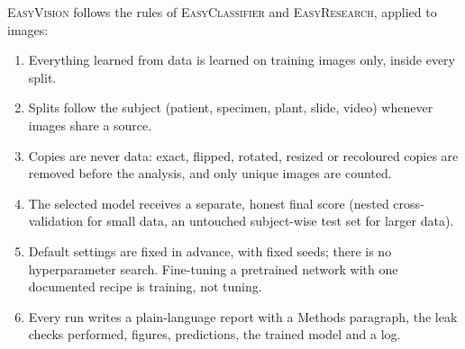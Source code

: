 \documentclass[11pt,a4paper]{article}
\newcommand{\EV}{\textsc{EasyVision}}
\newcommand{\EC}{\textsc{EasyClassifier}}
\newcommand{\ER}{\textsc{EasyResearch}}
\begin{document}
\EV{} follows the rules of \EC{} and \ER, applied to images:
\begin{enumerate}
  \item Everything learned from data is learned on training images only, inside every split.
  \item Splits follow the subject (patient, specimen, plant, slide, video) whenever images share a source.
  \item Copies are never data: exact, flipped, rotated, resized or recoloured copies are removed before the analysis, and only unique images are counted.
  \item The selected model receives a separate, honest final score (nested cross-validation for small data, an untouched subject-wise test set for larger data).
  \item Default settings are fixed in advance, with fixed seeds; there is no hyperparameter search. Fine-tuning a pretrained network with one documented recipe is training, not tuning.
  \item Every run writes a plain-language report with a Methods paragraph, the leak checks performed, figures, predictions, the trained model and a log.
\end{enumerate}
\end{document}
